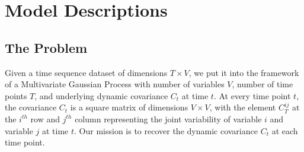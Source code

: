 \documentclass[12pt]{article}
\begin{document}
\section{Model Descriptions}
\subsection{The Problem}\label{theProblem}
Given a time sequence dataset of dimensions $T\times V$, we put it into the framework of a Multivariate Gaussian Process with number of variables $V$, number of time points $T$, and underlying dynamic covariance $C_t$ at time $t$. At every time point $t$, the covariance $C_t$ is a square matrix of dimensions $V \times V$, with the element $C^{ij}_T$ at the $i^{th}$ row and $j^{th}$ column representing the joint variability of variable $i$ and variable $j$ at time $t$. Our mission is to recover the dynamic covariance $C_t$ at each time point.\par
\end{document}

